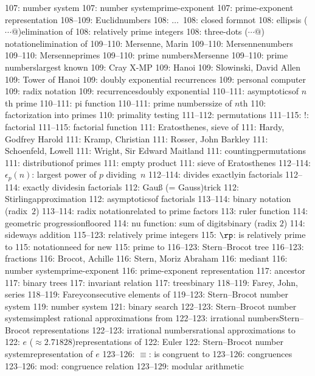 107: number system
107: number system\sub prime-exponent
107: prime-exponent representation
108--109: Euclid\sub numbers
108: $\ldots\,$
108: closed form\sub not
108: ellipsis ($\cdots@$)\sub elimination of
108: relatively prime integers
108: three-dots ($\cdots@$) notation\sub elimination of
109--110: Mersenne, Marin
109--110: Mersenne\sub numbers
109--110: Mersenne\sub primes
109--110: prime numbers\sub Mersenne
109--110: prime numbers\sub largest known
109: Cray X-MP
109: Hanoi
109: Slowinski, David Allen
109: Tower of Hanoi
109: doubly exponential recurrences
109: personal computer
109: radix notation
109: recurrences\sub doubly exponential
110--111: asymptotics\sub of $n$th prime
110--111: pi function
110--111: prime numbers\sub size of $n$th
110: factorization into primes
110: primality testing
111--112: permutations
111--115: $!$: factorial
111--115: factorial function
111: Eratosthenes, sieve of
111: Hardy, Godfrey Harold
111: Kramp, Christian
111: Rosser, John Barkley
111: Schoenfeld, Lowell
111: Wright, Sir Edward Maitland
111: counting\sub permutations
111: distribution\sub of primes
111: empty product
111: sieve of Eratosthenes
112--114: $\epsilon_p(n)$: largest power of $p$ dividing~$n$
112--114: divides exactly\sub in factorials
112--114: exactly divides\sub in factorials
112: Gau{\ss} (= Gauss)\sub trick
112: Stirling\sub approximation
112: asymptotics\sub of factorials
113--114: binary notation (radix~$2$)
113--114: radix notation\sub related to prime factors
113: ruler function
114: geometric progression\sub floored
114: nu function: sum of digits\sub binary (radix $2$)
114: sideways addition
115--123: relatively prime integers
115: $\rp$: is relatively prime to
115: notation\sub need for new
115: prime to
116--123: Stern--Brocot tree
116--123: fractions
116: Brocot, Achille
116: Stern, Moriz Abraham
116: mediant
116: number system\sub prime-exponent
116: prime-exponent representation
117: ancestor
117: binary trees
117: invariant relation
117: trees\sub binary
118--119: Farey, John, series
118--119: Farey\sub consecutive elements of
119--123: Stern--Brocot number system
119: number system
121: binary search
122--123: Stern--Brocot number system\sub simplest rational approximations from
122--123: irrational numbers\sub Stern--Brocot representations
122--123: irrational numbers\sub rational approximations to
122: $e$ ($\approx2.71828$)\sub representations of
122: Euler
122: Stern--Brocot number system\sub representation of $e$
123--126: $\equiv$: is congruent to
123--126: congruences
123--126: mod: congruence relation
123--129: modular arithmetic
